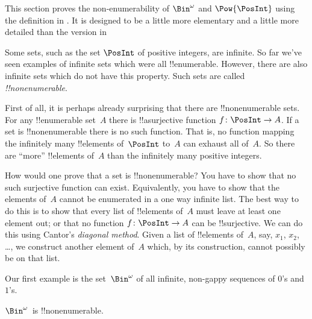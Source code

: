 \documentclass[../../../include/open-logic-section]{subfiles}
\begin{document}


\begin{editorial}
  This section proves the non-enumerability of $\Bin^\omega$ and
  $\Pow{\PosInt}$ using the definition in . It is
  designed to be a little more elementary and a little more detailed
  than the version in 
\end{editorial}

Some sets, such as the set $\PosInt$ of positive integers, are
infinite. So far we've seen examples of infinite sets which were all
!!{enumerable}. However, there are also infinite sets which do not
have this property. Such sets are called \emph{!!{nonenumerable}}.

First of all, it is perhaps already surprising that there are
!!{nonenumerable} sets.  For any !!{enumerable} set~$A$ there is
!!a{surjective} function $f \colon \PosInt \to A$.  If a set is
!!{nonenumerable} there is no such function.  That is, no function
mapping the infinitely many !!{element}s of~$\PosInt$ to~$A$ can
exhaust all of~$A$.  So there are ``more'' !!{element}s of~$A$ than
the infinitely many positive integers.

How would one prove that a set is !!{nonenumerable}? You have to show
that no such surjective function can exist. Equivalently, you have to
show that the elements of~$A$ cannot be enumerated in a one way
infinite list.  The best way to do this is to show that every list of
!!{element}s of~$A$ must leave at least one element out; or that no
function $f\colon \PosInt \to A$ can be !!{surjective}.  We can do this
using Cantor's \emph{diagonal method}.  Given a list of !!{element}s
of~$A$, say, $x_1$, $x_2$, \dots, we construct another element of~$A$
which, by its construction, cannot possibly be on that list.

Our first example is the set~$\Bin^\omega$ of all infinite, non-gappy
sequences of $0$'s and $1$'s.

\begin{thm}
$\Bin^\omega$~is !!{nonenumerable}.
\end{thm}
\end{document}
